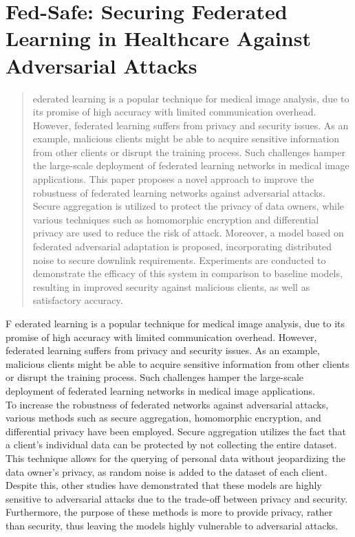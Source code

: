 \chapter{Fed-Safe: Securing Federated Learning in Healthcare Against Adversarial Attacks}
\begin{abstract}
    
ederated learning is a popular technique for medical image analysis, due to its promise of high accuracy with limited communication overhead. However, federated learning suffers from privacy and security issues. As an example, malicious clients might be able to acquire sensitive information from other clients or disrupt the training process. Such challenges hamper the large-scale deployment of federated learning networks in medical image applications.  This paper proposes a novel approach to improve the robustness of federated learning networks against adversarial attacks. Secure aggregation is utilized to protect the privacy of data owners, while various techniques such as homomorphic encryption and differential privacy are used to reduce the risk of attack. Moreover, a model based on federated adversarial adaptation is proposed, incorporating distributed noise to secure downlink requirements. Experiments are conducted to demonstrate the efficacy of this system in comparison to baseline models, resulting in improved security against malicious clients, as well as satisfactory accuracy.
\end{abstract}
\newpage
\lettrine{F}{} ederated learning is a popular technique for medical image analysis, due to its promise of high accuracy with limited communication overhead. However, federated learning suffers from privacy and security issues. As an example, malicious clients might be able to acquire sensitive information from other clients or disrupt the training process. Such challenges hamper the large-scale deployment of federated learning networks in medical image applications. 
\\To increase the robustness of federated networks against adversarial attacks, various methods such as secure aggregation, homomorphic encryption, and differential privacy have been employed. Secure aggregation utilizes the fact that a client's individual data can be protected by not collecting the entire dataset. This technique allows for the querying of personal data without jeopardizing the data owner's privacy, as random noise is added to the dataset of each client. Despite this, other studies have demonstrated that these models are highly sensitive to adversarial attacks due to the trade-off between privacy and security. Furthermore, the purpose of these methods is more to provide privacy, rather than security, thus leaving the models highly vulnerable to adversarial attacks.
